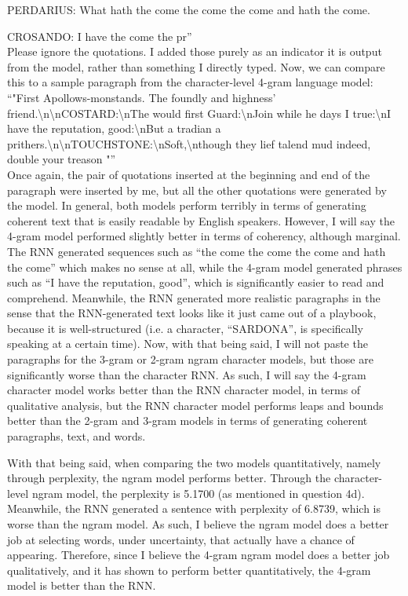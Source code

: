 \begin{solution}
PERDARIUS:
What hath the come the come the come and hath the come.

CROSANDO:
I have the come the pr''\\

Please ignore the quotations. I added those purely as an indicator it is output from the model, rather than something I directly typed. Now, we can compare this to a sample paragraph from the character-level 4-gram language model:\\

``"First Apollows-monstands. The foundly and highness' friend.\textbackslash n\textbackslash nCOSTARD:\textbackslash nThe would first Guard:\textbackslash nJoin while he days I true:\textbackslash nI have the reputation, good:\textbackslash nBut a tradian a prithers.\textbackslash n\textbackslash nTOUCHSTONE:\textbackslash nSoft,\textbackslash nthough they lief talend mud indeed, double your treason "''\\

Once again, the pair of quotations inserted at the beginning and end of the paragraph were inserted by me, but all the other quotations were generated by the model. In general, both models perform terribly in terms of generating coherent text that is easily readable by English speakers. However, I will say the 4-gram model performed slightly better in terms of coherency, although marginal. The RNN generated sequences such as ``the come the come the come and hath the come'' which makes no sense at all, while the 4-gram model generated phrases such as ``I have the reputation, good'', which is significantly easier to read and comprehend. Meanwhile, the RNN generated more realistic paragraphs in the sense that the RNN-generated text looks like it just came out of a playbook, because it is well-structured (i.e. a character, ``SARDONA'', is specifically speaking at a certain time). Now, with that being said, I will not paste the paragraphs for the 3-gram or 2-gram ngram character models, but those are significantly worse than the character RNN. As such, I will say the 4-gram character model works better than the RNN character model, in terms of qualitative analysis, but the RNN character model performs leaps and bounds better than the 2-gram and 3-gram models in terms of generating coherent paragraphs, text, and words.

With that being said, when comparing the two models quantitatively, namely through perplexity, the ngram model performs better. Through the character-level ngram model, the perplexity is 5.1700 (as mentioned in question 4d). Meanwhile, the RNN generated a sentence with perplexity of 6.8739, which is worse than the ngram model. As such, I believe the ngram model does a better job at selecting words, under uncertainty, that actually have a chance of appearing. Therefore, since I believe the 4-gram ngram model does a better job qualitatively, and it has shown to perform better quantitatively, the 4-gram model is better than the RNN.
\end{solution}